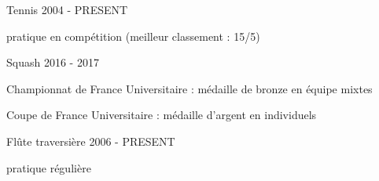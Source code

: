 \begin{cventries}


  
  \cventry
    {} %
    {Tennis}  %
    {} %
    {2004 - PRESENT} %
    {
      \begin{cvitems} %
        \item {pratique en compétition (meilleur classement : 15/5)}
      \end{cvitems}
    }

  \cventry
    {} %
    {Squash} %
    {} %
    {2016 - 2017} %
    {
      \begin{cvitems} %
        \item {Championnat de France Universitaire : médaille de bronze en équipe mixtes}
        \item {Coupe de France Universitaire : médaille d'argent en individuels}
      \end{cvitems}
    }

  \cventry
    {} %
    {Flûte traversière} %
    {} %
    {2006 - PRESENT} %
    {
      \begin{cvitems} %
        \item {pratique régulière}
      \end{cvitems}
    }


\end{cventries}

